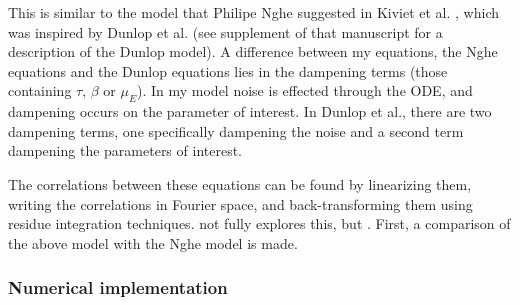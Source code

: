 This is similar to the model that Philipe Nghe suggested in Kiviet et al. \cite{Kiviet2014}, which was inspired by Dunlop et al. \cite{Dunlop2008} (see supplement of that manuscript for a description of the Dunlop model).
%
A difference between my equations, the Nghe equations and the Dunlop equations lies in the dampening terms (those containing $\tau$, $\beta$ or $\mu_E$). In my model noise is effected through the ODE, and dampening occurs on the parameter of interest. In Dunlop et al., there are two dampening terms, one specifically dampening the noise and a second term dampening the parameters of interest. 

The correlations between these equations can be found by linearizing them, writing the correlations in Fourier space, and back-transforming them using residue integration techniques. 
 not fully explores this, but .
First, a comparison of the above model with the Nghe model is made.

\subsubsection*{Numerical implementation}

